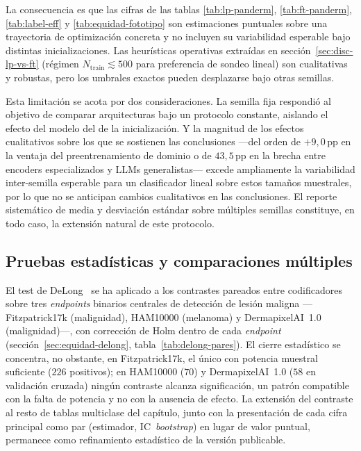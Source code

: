La consecuencia es que las cifras de las tablas
\ref{tab:lp-panderm}, \ref{tab:ft-panderm}, \ref{tab:label-eff} y
\ref{tab:equidad-fototipo} son estimaciones puntuales sobre una
trayectoria de optimización concreta y no incluyen su variabilidad
esperable bajo distintas inicializaciones. Las heurísticas
operativas extraídas en sección~\ref{sec:disc-lp-vs-ft}
(régimen $N_{\mathrm{train}} \lesssim 500$ para preferencia de
sondeo lineal) son cualitativas y robustas, pero los umbrales
exactos pueden desplazarse bajo otras semillas.

Esta limitación se acota por dos consideraciones. La semilla fija
respondió al objetivo de comparar arquitecturas bajo un protocolo
constante, aislando el efecto del modelo del de la inicialización. Y
la magnitud de los efectos cualitativos sobre los que se sostienen las
conclusiones ---del orden de $+9{,}0$\,pp en la ventaja del
preentrenamiento de dominio o de $43{,}5$\,pp en la brecha entre
encoders especializados y LLMs generalistas--- excede ampliamente la
variabilidad inter-semilla esperable para un clasificador lineal sobre
estos tamaños muestrales, por lo que no se anticipan cambios
cualitativos en las conclusiones. El reporte sistemático de media y
desviación estándar sobre múltiples semillas constituye, en todo caso,
la extensión natural de este protocolo.

\subsection{Pruebas estadísticas y comparaciones múltiples}
\label{sec:lim-estadistica}

El test de DeLong~\cite{delong1988} se ha aplicado a los contrastes
pareados entre codificadores sobre tres \emph{endpoints} binarios
centrales de detección de lesión maligna ---Fitzpatrick17k (malignidad),
HAM10000 (melanoma) y DermapixelAI~1.0 (malignidad)---, con corrección
de Holm dentro de cada \emph{endpoint} (sección~\ref{sec:equidad-delong},
tabla~\ref{tab:delong-pares}). El cierre estadístico se concentra, no
obstante, en Fitzpatrick17k, el único con potencia muestral suficiente
($226$ positivos); en HAM10000 ($70$) y DermapixelAI~1.0 ($58$ en
validación cruzada) ningún contraste alcanza significación, un patrón
compatible con la falta de potencia y no con la ausencia de efecto. La
extensión del contraste al resto de tablas multiclase del capítulo,
junto con la presentación de cada cifra principal como par (estimador,
IC~\emph{bootstrap}) en lugar de valor puntual, permanece como
refinamiento estadístico de la versión publicable.

